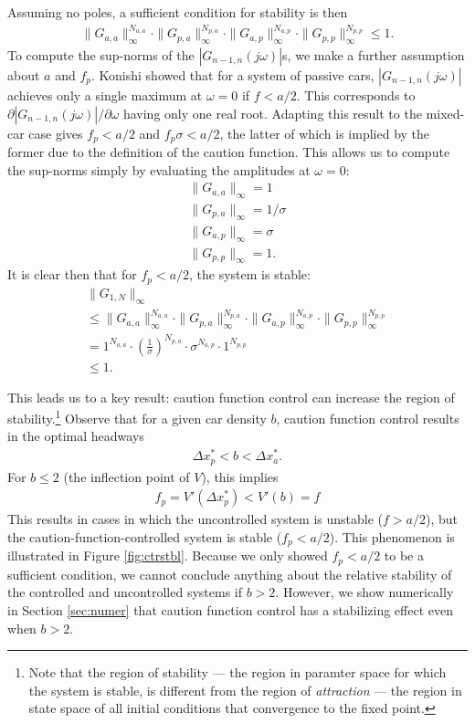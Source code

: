 \documentclass[10pt,twocolumn]{article}
\begin{document}
Assuming no poles, a sufficient condition for stability is then
\begin{align*}
\|G_{a,a}\|_{\infty}^{N_{a,a}} \cdot \|G_{p,a}\|_{\infty}^{N_{p,a}} \cdot \|G_{a,p}\|_{\infty}^{N_{a,p}} \cdot \|G_{p,p}\|_{\infty}^{N_{p,p}} \leq 1.
\end{align*}
To compute the sup-norms of the $|G_{n-1,n}(j\omega)|$s, we make a further assumption about $a$ and $f_p$. Konishi \cite{Konishi} showed that for a system of passive cars, $|G_{n-1,n}(j\omega)|$ achieves only a single maximum at $\omega=0$ if $f < a/2$. This corresponds to $\partial |G_{n-1,n}(j\omega)|/\partial \omega$ having only one real root. Adapting this result to the mixed-car case gives $f_p < a/2$ and $f_p\sigma < a/2$, the latter of which is implied by the former due to the definition of the caution function. This allows us to compute the sup-norms simply by evaluating the amplitudes at $\omega=0$:
\begin{gather}
\|G_{a,a}\|_{\infty} = 1\\
\|G_{p,a}\|_{\infty} = 1/\sigma\\
\|G_{a,p}\|_{\infty} = \sigma\\
\|G_{p,p}\|_{\infty} = 1.
\end{gather}
It is clear then that for $f_p < a/2$, the system is stable:
\begin{align*}
&\|G_{1,N}\|_{\infty}&\\
&\leq \|G_{a,a}\|_{\infty}^{N_{a,a}} \cdot \|G_{p,a}\|_{\infty}^{N_{p,a}} \cdot \|G_{a,p}\|_{\infty}^{N_{a,p}} \cdot \|G_{p,p}\|_{\infty}^{N_{p,p}}& \\
&= 1^{N_{a,a}} \cdot \left(\frac{1}{\sigma}\right)^{N_{p,a}} \cdot \sigma^{N_{a,p}} \cdot 1^{N_{p,p}}& \\
&\leq 1.&
\end{align*}

This leads us to a key result: caution function control can increase the region of stability.\footnote{Note that the region of stability --- the region in paramter space for which the system is stable, is different from the region of {\em attraction} --- the region in state space of all initial conditions that convergence to the fixed point.} Observe that for a given car density $b$, caution function control results in the optimal headways 
\begin{gather}
\Delta x_p^* < b < \Delta x_a^*.
\end{gather}
For $b \leq 2$ (the inflection point of $V$), this implies
\begin{gather}
f_p = V'(\Delta x_p^*) < V'(b) = f
\end{gather}
This results in cases in which the uncontrolled system is unstable ($f > a/2$), but the caution-function-controlled system is stable ($f_p < a/2$). This phenomenon is illustrated in Figure \ref{fig:ctrstbl}. Because we only showed $f_p < a/2$ to be a sufficient condition, we cannot conclude anything about the relative stability of the controlled and uncontrolled systems if $b>2$. However, we show numerically in Section \ref{sec:numer} that caution function control has a stabilizing effect even when $b>2$. 
\end{document}
